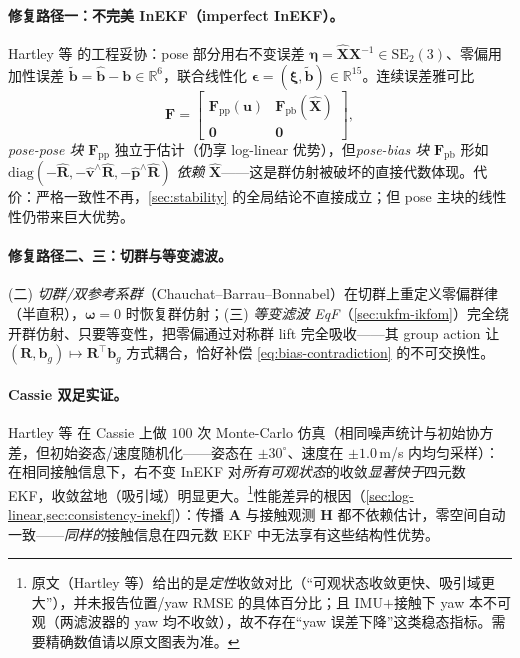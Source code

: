 \paragraph{修复路径一：不完美 InEKF（imperfect InEKF）。}Hartley 等\cite{hartley2020contact} 的工程妥协：pose 部分用右不变误差 $\boldsymbol{\eta}=\hat{\mathbf{X}}\mathbf{X}^{-1}\in\mathrm{SE}_2(3)$、零偏用加性误差 $\tilde{\mathbf{b}}=\hat{\mathbf{b}}-\mathbf{b}\in\mathbb{R}^6$，联合线性化 $\boldsymbol{\epsilon}=(\boldsymbol{\xi},\tilde{\mathbf{b}})\in\mathbb{R}^{15}$。连续误差雅可比
\begin{equation}
  \mathbf{F}=\begin{bmatrix}\mathbf{F}_{\mathrm{pp}}(\mathbf{u})&\mathbf{F}_{\mathrm{pb}}(\hat{\mathbf{X}})\\\mathbf{0}&\mathbf{0}\end{bmatrix},
  \label{eq:imperfect-F}
\end{equation}
\emph{pose-pose 块} $\mathbf{F}_{\mathrm{pp}}$ 独立于估计（仍享 log-linear 优势），但\emph{pose-bias 块} $\mathbf{F}_{\mathrm{pb}}$ 形如 $\mathrm{diag}(-\hat{\mathbf{R}},-\hat{\mathbf{v}}^\wedge\hat{\mathbf{R}},-\hat{\mathbf{p}}^\wedge\hat{\mathbf{R}})$ \emph{依赖} $\hat{\mathbf{X}}$——这是群仿射被破坏的直接代数体现。代价：严格一致性不再，\cref{sec:stability} 的全局结论不直接成立；但 pose 主块的线性性仍带来巨大优势。

\paragraph{修复路径二、三：切群与等变滤波。}(二) \emph{切群/双参考系群}（Chauchat--Barrau--Bonnabel\cite{chauchat2022tangent}）在切群上重定义零偏群律（半直积），$\boldsymbol{\omega}=0$ 时恢复群仿射；(三) \emph{等变滤波 EqF}（\cref{sec:ukfm-ikfom}）完全绕开群仿射、只要等变性，把零偏通过对称群 lift 完全吸收——其 group action 让 $(\mathbf{R},\mathbf{b}_g)\mapsto\mathbf{R}^\top\mathbf{b}_g$ 方式耦合，恰好补偿 \cref{eq:bias-contradiction} 的不可交换性\cite{fornasier2022overcoming}。

\paragraph{Cassie 双足实证。}Hartley 等\cite{hartley2020contact} 在 Cassie 上做 $100$ 次 Monte-Carlo 仿真（相同噪声统计与初始协方差，但初始姿态/速度随机化——姿态在 $\pm30^\circ$、速度在 $\pm1.0\,$m/s 内均匀采样）：在相同接触信息下，右不变 InEKF 对\emph{所有可观状态}的收敛\emph{显著快于}四元数 EKF，收敛盆地（吸引域）明显更大。\footnote{原文（Hartley 等\cite{hartley2020contact}）给出的是\emph{定性}收敛对比（“可观状态收敛更快、吸引域更大”），并未报告位置/yaw RMSE 的具体百分比；且 IMU$+$接触下 yaw 本不可观（两滤波器的 yaw 均不收敛），故不存在“yaw 误差下降”这类稳态指标。需要精确数值请以原文图表为准。}性能差异的根因（\cref{sec:log-linear,sec:consistency-inekf}）：传播 $\mathbf{A}$ 与接触观测 $\mathbf{H}$ 都不依赖估计，零空间自动一致——\emph{同样的}接触信息在四元数 EKF 中无法享有这些结构性优势。

